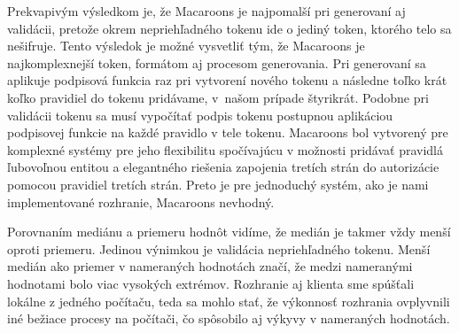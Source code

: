 Prekvapivým výsledkom je, že Macaroons je najpomalší pri generovaní aj validácii, pretože okrem nepriehľadného tokenu ide o jediný token, ktorého telo sa nešifruje. Tento výsledok je možné vysvetliť tým, že Macaroons je najkomplexnejší token, formátom aj procesom generovania. Pri generovaní sa aplikuje podpisová funkcia raz pri vytvorení nového tokenu a následne toľko krát koľko pravidiel do tokenu pridávame, v~našom prípade štyrikrát. Podobne pri validácii tokenu sa musí vypočítať podpis tokenu postupnou aplikáciou podpisovej funkcie na každé pravidlo v tele tokenu. Macaroons bol vytvorený pre komplexné systémy pre jeho flexibilitu spočívajúcu v možnosti pridávať pravidlá ľubovoľnou entitou a elegantného riešenia zapojenia tretích strán do autorizácie pomocou pravidiel tretích strán. Preto je pre jednoduchý systém, ako je nami implementované rozhranie, Macaroons nevhodný.

Porovnaním mediánu a priemeru hodnôt vidíme, že medián je takmer vždy menší oproti priemeru. Jedinou výnimkou je validácia nepriehľadného tokenu. Menší medián ako priemer v nameraných hodnotách značí, že medzi nameranými hodnotami bolo viac vysokých extrémov. Rozhranie aj klienta sme spúšťali lokálne z jedného počítaču, teda sa mohlo stať, že výkonnosť rozhrania ovplyvnili iné bežiace procesy na počítači, čo spôsobilo aj výkyvy v nameraných hodnotách.